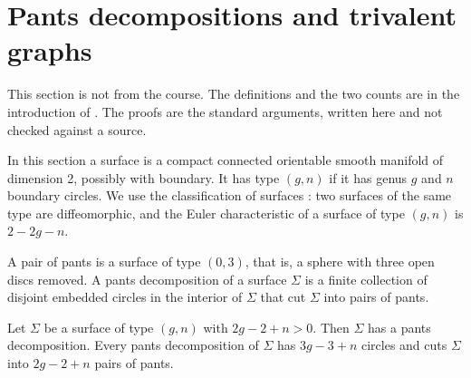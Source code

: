 \section{Pants decompositions and trivalent graphs}
\label{section-pants-decompositions}

\begin{reference}
This section is not from the course.  The
definitions and the two counts are in the
introduction of \cite{hatcher-pants}.  The
proofs are the standard arguments, written
here and not checked against a source.
\end{reference}

\noindent
In this section a surface is a compact
connected orientable smooth manifold of
dimension 2, possibly with boundary.  It has
type $(g,n)$ if it has genus $g$ and $n$
boundary circles.  We use the classification
of surfaces \cite{hirsch}: two surfaces of
the same type are diffeomorphic, and the
Euler characteristic of a surface of type
$(g,n)$ is $2-2g-n$.

A pair of pants is a surface of type
$(0,3)$, that is, a sphere with three open
discs removed.  A pants decomposition of a
surface $\Sigma$ is a finite collection of
disjoint embedded circles in the interior of
$\Sigma$ that cut $\Sigma$ into pairs of
pants.

\begin{theorem}
\label{theorem-pants-decomposition}
Let $\Sigma$ be a surface of type $(g,n)$
with $2g-2+n>0$.  Then $\Sigma$ has a pants
decomposition.  Every pants decomposition of
$\Sigma$ has $3g-3+n$ circles and cuts
$\Sigma$ into $2g-2+n$ pairs of pants.
\end{theorem}

